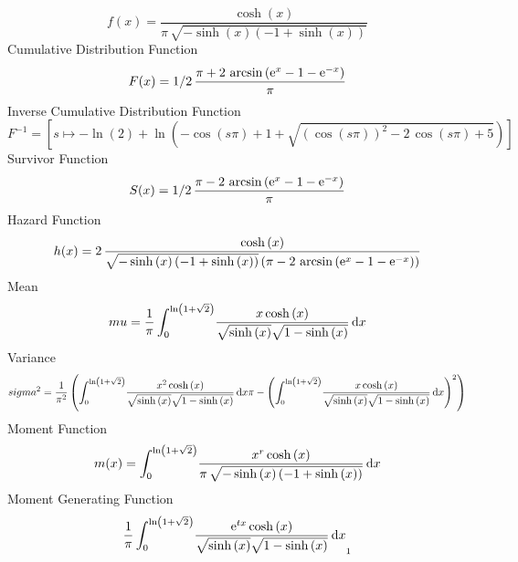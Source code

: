 \documentclass[12pt]{article}
\begin{document}
$$  f(x)={\frac {\cosh \left( x \right) }{\pi\,\sqrt {-\sinh \left( x \right) 
 \left( -1+\sinh \left( x \right)  \right) }}}
$$Cumulative Distribution Function  
 $$F(x)=1/2\,{\frac {\pi+2\,\arcsin \left( {{\rm e}^{x}}-1-{{\rm e}^{-x}}
 \right) }{\pi}}
$$ Inverse Cumulative Distribution Function 
  $$F^{-1} = [s\mapsto -\ln  \left( 2 \right) +\ln  \left( -\cos \left( s\pi
 \right) +1+\sqrt { \left( \cos \left( s\pi \right)  \right) ^{2}-2\,
\cos \left( s\pi \right) +5} \right) ]
$$Survivor Function 
 $$ S(x)=1/2\,{\frac {\pi-2\,\arcsin \left( {{\rm e}^{x}}-1-{{\rm e}^{-x}}
 \right) }{\pi}}
$$ Hazard Function 
 $$ h(x)=2\,{\frac {\cosh \left( x \right) }{\sqrt {-\sinh \left( x \right) 
 \left( -1+\sinh \left( x \right)  \right) } \left( \pi-2\,\arcsin
 \left( {{\rm e}^{x}}-1-{{\rm e}^{-x}} \right)  \right) }}
$$ Mean 
 $$ mu={\frac {1}{\pi}\int_{0}^{\ln  \left( 1+\sqrt {2} \right) }\!{\frac {x
\cosh \left( x \right) }{\sqrt {\sinh \left( x \right) }\sqrt {1-\sinh
 \left( x \right) }}}\,{\rm d}x}
$$ Variance 
 $$ sigma^2 = {\frac {1}{{\pi}^{2}} \left( \int_{0}^{\ln  \left( 1+\sqrt {2}
 \right) }\!{\frac {{x}^{2}\cosh \left( x \right) }{\sqrt {\sinh
 \left( x \right) }\sqrt {1-\sinh \left( x \right) }}}\,{\rm d}x\pi-
 \left( \int_{0}^{\ln  \left( 1+\sqrt {2} \right) }\!{\frac {x\cosh
 \left( x \right) }{\sqrt {\sinh \left( x \right) }\sqrt {1-\sinh
 \left( x \right) }}}\,{\rm d}x \right) ^{2} \right) }
$$ Moment Function 
 $$ m(x) = \int_{0}^{\ln  \left( 1+\sqrt {2} \right) }\!{\frac {{x}^{r}\cosh
 \left( x \right) }{\pi\,\sqrt {-\sinh \left( x \right)  \left( -1+
\sinh \left( x \right)  \right) }}}\,{\rm d}x
$$ Moment Generating Function 
 $${\frac {1}{\pi}\int_{0}^{\ln  \left( 1+\sqrt {2} \right) }\!{\frac {{
{\rm e}^{tx}}\cosh \left( x \right) }{\sqrt {\sinh \left( x \right) }
\sqrt {1-\sinh \left( x \right) }}}\,{\rm d}x}_{{1}}
$$
\end{document}

